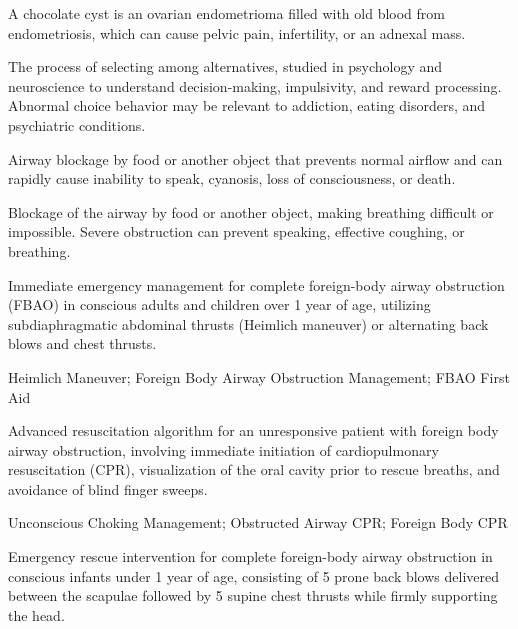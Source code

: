  A chocolate cyst is an ovarian endometrioma filled with old blood from endometriosis, which can cause pelvic pain, infertility, or an adnexal mass.

 The process of selecting among alternatives, studied in psychology and neuroscience to understand decision-making, impulsivity, and reward processing. Abnormal choice behavior may be relevant to addiction, eating disorders, and psychiatric conditions.

 Airway blockage by food or another object that prevents normal airflow and can rapidly cause inability to speak, cyanosis, loss of consciousness, or death.

 Blockage of the airway by food or another object, making breathing difficult or impossible. Severe obstruction can prevent speaking, effective coughing, or breathing.

 Immediate emergency management for complete foreign-body airway obstruction (FBAO) in conscious adults and children over 1 year of age, utilizing subdiaphragmatic abdominal thrusts (Heimlich maneuver) or alternating back blows and chest thrusts.


\synonyms
Heimlich Maneuver; Foreign Body Airway Obstruction Management; FBAO First Aid

 Advanced resuscitation algorithm for an unresponsive patient with foreign body airway obstruction, involving immediate initiation of cardiopulmonary resuscitation (CPR), visualization of the oral cavity prior to rescue breaths, and avoidance of blind finger sweeps.


\synonyms
Unconscious Choking Management; Obstructed Airway CPR; Foreign Body CPR

 Emergency rescue intervention for complete foreign-body airway obstruction in conscious infants under 1 year of age, consisting of 5 prone back blows delivered between the scapulae followed by 5 supine chest thrusts while firmly supporting the head.


